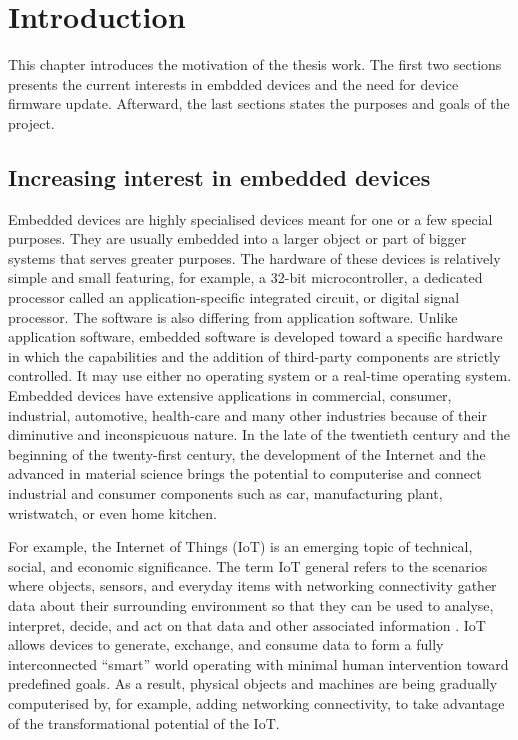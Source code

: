 
\section{Introduction}
\justify
This chapter introduces the motivation of the thesis work. The first two sections 
presents the current interests in embdded devices and the need for device firmware
update. Afterward, the last sections states the purposes and goals of the project.

\subsection{Increasing interest in embedded devices}
\justify
Embedded devices are highly specialised devices meant for one or a 
few special purposes. They are usually embedded into a larger object 
or part of bigger systems that serves greater purposes. The hardware 
of these devices is relatively simple and small featuring, for example, 
a 32-bit microcontroller, a dedicated processor called an application-specific 
integrated circuit, or digital signal processor. The software is also 
differing from application software. Unlike application software, embedded 
software is developed toward a specific hardware in which the capabilities 
and the addition of third-party components are strictly controlled. It may 
use either no operating system or a real-time operating system. Embedded 
devices have extensive applications in commercial, consumer, industrial, 
automotive, health-care and many other industries because of their diminutive 
and inconspicuous nature. In the late of the twentieth century and the 
beginning of the twenty-first century, the development of the Internet 
and the advanced in material science brings the potential to computerise 
and connect industrial and consumer components such as car, manufacturing 
plant, wristwatch, or even home kitchen. 

\justify
For example, the Internet of Things (IoT) is an emerging topic of technical, 
social, and economic significance. The term IoT general refers to the 
scenarios where objects, sensors, and everyday items with networking 
connectivity gather data about their surrounding environment so that they 
can be used to analyse, interpret, decide, and act on that data and other 
associated information \cite{KSL15}. IoT allows devices to generate, exchange, 
and consume data to form a fully interconnected “smart” world operating with 
minimal human intervention toward predefined goals. As a result, physical objects 
and machines are being gradually computerised by, for example, adding 
networking connectivity, to take advantage of the transformational 
potential of the IoT. 

